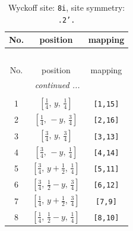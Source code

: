 \documentclass[fleqn,8pt]{jsarticle}
\begin{document}
\begin{longtable}{ccc}
\caption{Wyckoff site: {\tt 8i}, site symmetry: {\tt .2'.}}
 \\
 \hline \hline
No. & position & mapping \\ \hline \endfirsthead

\multicolumn{2}{l}{\tablename\ \thetable{}} \\
 \hline \hline
No. & position & mapping \\ \hline \endhead

 \hline \hline
\multicolumn{2}{r}{\footnotesize\it continued ...} \\ \endfoot

 \hline \hline
\multicolumn{2}{r}{} \\ \endlastfoot

1 & $\left[ \frac{1}{4},\, y,\, \frac{1}{4} \right]$ & {\tt [1,15]} \\ \hline
2 & $\left[ \frac{1}{4},\, - y,\, \frac{3}{4} \right]$ & {\tt [2,16]} \\ \hline
3 & $\left[ \frac{3}{4},\, y,\, \frac{3}{4} \right]$ & {\tt [3,13]} \\ \hline
4 & $\left[ \frac{3}{4},\, - y,\, \frac{1}{4} \right]$ & {\tt [4,14]} \\ \hline
5 & $\left[ \frac{3}{4},\, y + \frac{1}{2},\, \frac{1}{4} \right]$ & {\tt [5,11]} \\ \hline
6 & $\left[ \frac{3}{4},\, \frac{1}{2} - y,\, \frac{3}{4} \right]$ & {\tt [6,12]} \\ \hline
7 & $\left[ \frac{1}{4},\, y + \frac{1}{2},\, \frac{3}{4} \right]$ & {\tt [7,9]} \\ \hline
8 & $\left[ \frac{1}{4},\, \frac{1}{2} - y,\, \frac{1}{4} \right]$ & {\tt [8,10]} \\
\end{longtable}
\renewcommand{\arraystretch}{1.2}
\end{document}
